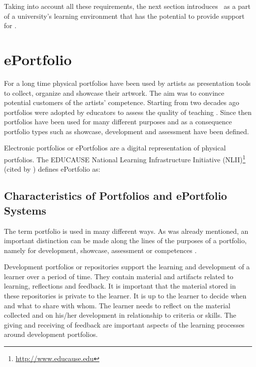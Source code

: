 Taking into account all these requirements, the next section introduces \ep~as a
part of a university's learning environment that has the potential to provide
support for \LLLsn.

\section{ePortfolio}
For a long time physical portfolios have been used by artists as presentation
tools to collect, organize and showcase their artwork. The aim was to convince
potential customers of the artists' competence. Starting from two decades ago
portfolios were adopted by educators to assess the quality of teaching
\citep{VanTartwijkJ.2004}. Since then portfolios have been used for many
different purposes and as a consequence portfolio types such as showcase,
development and assessment have been defined.
 
Electronic portfolios or ePortfolios are a digital representation of physical
portfolios. The EDUCAUSE National Learning Infrastructure Initiative
(NLII)\footnote{\url{http://www.educause.edu}} (cited by
\citealp{IMSGlobalLearningConsortium2005}) defines ePortfolio as:


\subsection{Characteristics of Portfolios and ePortfolio Systems}
\label{sec:charep}
The term portfolio is used in many different ways. As was already mentioned, an
important distinction can be made along the lines of the purposes of a
portfolio, namely for development, showcase, assessment or competences
\citep{VanTartwijkJ.2004}.

Development portfolios or repositories support the learning and development of a
learner over a period of time. They contain material and artifacts related to
learning, reflections and feedback. It is important that the material stored in
these repositories is private to the learner. It is up to the learner to decide
when and what to share with whom. The learner needs to reflect on the material
collected and on his/her development in relationship to criteria or skills. The
giving and receiving of feedback are important aspects of the learning processes
around development portfolios.

